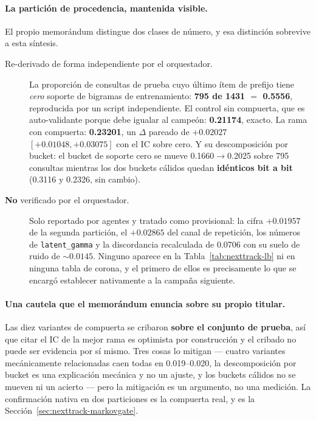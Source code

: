 \documentclass[11pt]{article}
\begin{document}
\paragraph{La partición de procedencia, mantenida visible.} El propio memorándum
distingue dos clases de número, y esa distinción sobrevive a esta síntesis.
\begin{description}
  \item[Re-derivado de forma independiente por el orquestador.] La proporción de
  consultas de prueba cuyo último ítem de prefijo tiene \emph{cero} soporte de
  bigramas de entrenamiento: \textbf{\num{795} de \num{1431} $=$ \num{0.5556}},
  reproducida por un script independiente. El control sin compuerta, que es
  auto-validante porque debe igualar al campeón: \textbf{\num{0.21174}}, exacto. La
  rama con compuerta: \textbf{\num{0.23201}}, un $\Delta$ pareado de
  $+\num{0.02027}$ $[+\num{0.01048}, +\num{0.03075}]$ con el IC sobre cero. Y su
  descomposición por bucket: el bucket de soporte cero se mueve
  \num{0.1660}$\to$\num{0.2025} sobre \num{795} consultas mientras los dos buckets
  cálidos quedan \textbf{idénticos bit a bit} (\num{0.3116} y \num{0.2326}, sin
  cambio).
  \item[\textbf{No} verificado por el orquestador.] Solo reportado por agentes y
  tratado como provisional: la cifra $+\num{0.01957}$ de la segunda partición, el
  $+\num{0.02865}$ del canal de repetición, los números de
  \texttt{latent\_gamma} y la discordancia recalculada de \num{0.0706} con su suelo
  de ruido de ${\sim}\num{0.0145}$. Ninguno aparece en la Tabla~\ref{tab:nexttrack-lb} ni
  en ninguna tabla de corona, y el primero de ellos es precisamente lo que se
  encargó establecer nativamente a la campaña siguiente.
\end{description}

\paragraph{Una cautela que el memorándum enuncia sobre su propio titular.} Las
diez variantes de compuerta se cribaron \textbf{sobre el conjunto de prueba}, así
que citar el IC de la mejor rama es optimista por construcción y el cribado no
puede ser evidencia por sí mismo. Tres cosas lo mitigan --- cuatro variantes
mecánicamente relacionadas caen todas en \numrange{0.019}{0.020}, la descomposición
por bucket es una explicación mecánica y no un ajuste, y los buckets cálidos no se
mueven ni un acierto --- pero la mitigación es un argumento, no una medición. La
confirmación nativa en dos particiones es la compuerta real, y es la
Sección~\ref{sec:nexttrack-markovgate}.
\end{document}
